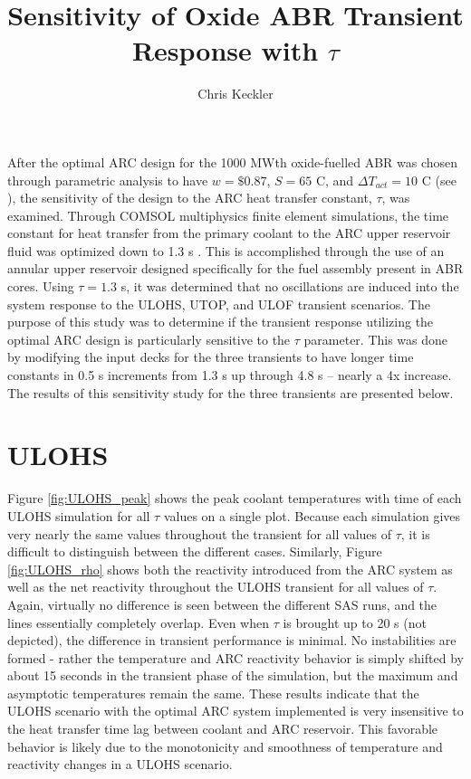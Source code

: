 \documentclass[11pt, oneside]{article}   	%
\title{Sensitivity of Oxide ABR Transient Response with $\tau$}
\author{Chris Keckler}
\begin{document}
\maketitle

After the optimal ARC design for the 1000 MWth oxide-fuelled ABR was chosen through parametric analysis to have $w = \$0.87$, $S = 65$ C, and $\Delta T_{act} = 10$ C (see \cite{2017ANSWinter_ARC}), the sensitivity of the design to the ARC heat transfer constant, $\tau$, was examined.
Through COMSOL multiphysics finite element simulations, the time constant for heat transfer from the primary coolant to the ARC upper reservoir fluid was optimized down to 1.3 s \cite{1stARC_paper}.
This is accomplished through the use of an annular upper reservoir designed specifically for the fuel assembly present in ABR cores. 
Using $\tau=1.3$ s, it was determined that no oscillations are induced into the system response to the ULOHS, UTOP, and ULOF transient scenarios. 
The purpose of this study was to determine if the transient response utilizing the optimal ARC design is particularly sensitive to the $\tau$ parameter. 
This was done by modifying the input decks for the three transients to have longer time constants in 0.5 s increments from 1.3 s up through 4.8 s -- nearly a 4x increase.
The results of this sensitivity study for the three transients are presented below.

\section{ULOHS}
Figure \ref{fig:ULOHS_peak} shows the peak coolant temperatures with time of each ULOHS simulation for all $\tau$ values on a single plot. 
Because each simulation gives very nearly the same values throughout the transient for all values of $\tau$, it is difficult to distinguish between the different cases. 
Similarly, Figure \ref{fig:ULOHS_rho} shows both the reactivity introduced from the ARC system as well as the net reactivity throughout the ULOHS transient for all values of $\tau$. 
Again, virtually no difference is seen between the different SAS runs, and the lines essentially completely overlap. 
Even when $\tau$ is brought up to 20 s (not depicted), the difference in transient performance is minimal.
No instabilities are formed - rather the temperature and ARC reactivity behavior is simply shifted by about 15 seconds in the transient phase of the simulation, but the maximum and asymptotic temperatures remain the same.
These results indicate that the ULOHS scenario with the optimal ARC system implemented is very insensitive to the heat transfer time lag between coolant and ARC reservoir.
This favorable behavior is likely due to the monotonicity and smoothness of temperature and reactivity changes in a ULOHS scenario.
\end{document}
